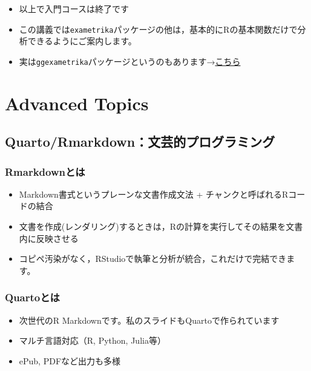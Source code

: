 \documentclass[
  a4paper,
]{ltjsbook}
\providecommand{\tightlist}{%
  \setlength{\itemsep}{0pt}\setlength{\parskip}{0pt}}\usepackage{longtable,booktabs,array}
\begin{document}
\begin{itemize}
\tightlist
\item
  以上で入門コースは終了です
\item
  この講義では\texttt{exametrika}パッケージの他は，基本的にRの基本関数だけで分析できるようにご案内します。
\item
  実は\texttt{ggexametrika}パッケージというのもあります→\href{https://github.com/kosugitti/ggExametrika}{こちら}
\end{itemize}

\section{Advanced Topics}\label{advanced-topics}

\subsection{Quarto/Rmarkdown：文芸的プログラミング}\label{quartormarkdownux6587ux82b8ux7684ux30d7ux30edux30b0ux30e9ux30dfux30f3ux30b0}

\subsubsection{Rmarkdownとは}\label{rmarkdownux3068ux306f}

\begin{itemize}
\item
  Markdown書式というプレーンな文書作成文法 +
  チャンクと呼ばれるRコードの結合
\item
  文書を作成(レンダリング)するときは，Rの計算を実行してその結果を文書内に反映させる
\item
  コピペ汚染がなく，RStudioで執筆と分析が統合，これだけで完結できます。
\end{itemize}

\subsubsection{Quartoとは}\label{quartoux3068ux306f}

\begin{itemize}
\tightlist
\item
  次世代のR Markdownです。私のスライドもQuartoで作られています
\item
  マルチ言語対応（R, Python, Julia等）
\item
  ePub, PDFなど出力も多様
\end{itemize}
\end{document}
